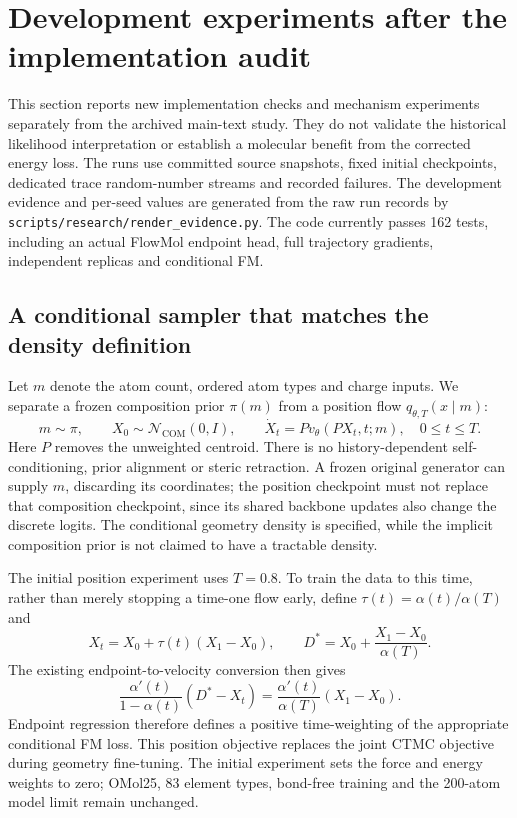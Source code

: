 \section{Development experiments after the implementation audit}
\label{app:newdevelopment}

This section reports new implementation checks and mechanism experiments separately from the
archived main-text study. They do not validate the historical likelihood interpretation or
establish a molecular benefit from the corrected energy loss. The runs use committed source
snapshots, fixed initial checkpoints, dedicated trace random-number streams and recorded failures.
The development evidence and per-seed values are generated from the raw run records by
\texttt{scripts/research/render\_evidence.py}. The code currently passes 162 tests, including an
actual FlowMol endpoint head, full trajectory gradients, independent replicas and conditional FM.

\subsection{A conditional sampler that matches the density definition}

Let $m$ denote the atom count, ordered atom types and charge inputs. We separate a frozen
composition prior $\pi(m)$ from a position flow $q_{\theta,T}(x\mid m)$:
\[
 m\sim\pi,\qquad X_0\sim\mathcal N_{\mathrm{COM}}(0,I),\qquad
 \dot X_t=P v_\theta(PX_t,t;m),\quad 0\le t\le T.
\]
Here $P$ removes the unweighted centroid. There is no history-dependent self-conditioning,
prior alignment or steric retraction. A frozen original generator can supply $m$, discarding
its coordinates; the position checkpoint must not replace that composition checkpoint, since
its shared backbone updates also change the discrete logits. The conditional geometry density
is specified, while the implicit composition prior is not claimed to have a tractable density.

The initial position experiment uses $T=0.8$. To train the data to this time, rather than merely
stopping a time-one flow early, define $\tau(t)=\alpha(t)/\alpha(T)$ and
\[
 X_t=X_0+\tau(t)(X_1-X_0),\qquad
 D^*=X_0+\frac{X_1-X_0}{\alpha(T)}.
\]
The existing endpoint-to-velocity conversion then gives
\[
 \frac{\alpha'(t)}{1-\alpha(t)}(D^*-X_t)
   =\frac{\alpha'(t)}{\alpha(T)}(X_1-X_0).
\]
Endpoint regression therefore defines a positive time-weighting of the appropriate conditional
FM loss. This position objective replaces the joint CTMC objective during geometry fine-tuning.
The initial experiment sets the force and energy weights to zero; OMol25, 83 element types,
bond-free training and the 200-atom model limit remain unchanged.


